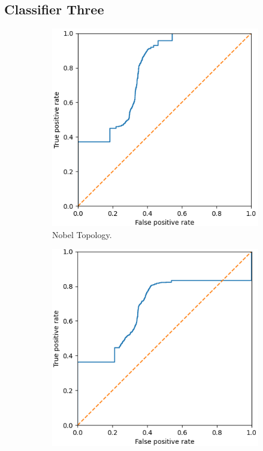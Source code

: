\subsection{Classifier Three}
\label{ssec:Ras3}
\noindent
\begin{figure}
    \centering
    \begin{subfigure}{0.475\textwidth}
        \includegraphics[width=\textwidth]{figs/results/nobel-germany_case3_roc.png}
        \caption{Nobel Topology.}
    \end{subfigure}
    \begin{subfigure}{0.475\textwidth}
        \includegraphics[width=\textwidth]{figs/results/france_case3_roc.png}

\end{subfigure}
\end{figure}
